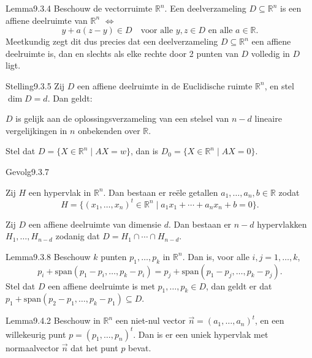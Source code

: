 \begin{res}{Lemma}{9.3.4}
Beschouw de vectorruimte $\mathbb R^n$. Een deelverzameling $D\subseteq\mathbb R^n$ is een affiene deelruimte van $\mathbb R^n$ \(\iff\)
\[
y+a(z-y)\in D \quad\text{voor alle } y,z\in D \text{ en alle } a\in\mathbb R. \tag{9.3}
\]
Meetkundig zegt dit dus precies dat een deelverzameling $D\subseteq\mathbb R^n$ een affiene deelruimte is, dan en slechts als elke rechte door 2 punten van $D$ volledig in $D$ ligt.
\end{res}

\begin{res}{Stelling}{9.3.5}
Zij $D$ een affiene deelruimte in de Euclidische ruimte $\mathbb R^n$, en stel $\dim D=d$. Dan geldt:
\begin{myenum}
\item $D$ is gelijk aan de oplossingsverzameling van een stelsel van $n-d$ lineaire vergelijkingen in $n$ onbekenden over $\mathbb R$.
\item Stel dat $D=\{X\in\mathbb R^n\mid AX=w\}$, dan is $D_0=\{X\in\mathbb R^n\mid AX=0\}$.
\end{myenum}
\end{res}

\begin{res}{Gevolg}{9.3.7}
\begin{myenum}
\item Zij $H$ een hypervlak in $\mathbb R^n$. Dan bestaan er re\"ele getallen $a_1,\dots,a_n,b\in\mathbb R$ zodat
\[
H=\{(x_1,\dots,x_n)^t\in\mathbb R^n \mid a_1x_1+\cdots+a_nx_n+b=0\}.
\]
\item Zij $D$ een affiene deelruimte van dimensie $d$. Dan bestaan er $n-d$ hypervlakken $H_1,\dots,H_{n-d}$ zodanig dat $D=H_1\cap\cdots\cap H_{n-d}$.
\end{myenum}
\end{res}

\begin{res}{Lemma}{9.3.8}
Beschouw $k$ punten $p_1,\dots,p_k$ in $\mathbb R^n$. Dan is, voor alle $i,j=1,\dots,k$,
\[
p_i+\mathrm{span}(p_1-p_i,\dots,p_k-p_i)=p_j+\mathrm{span}(p_1-p_j,\dots,p_k-p_j).
\]
Stel dat $D$ een affiene deelruimte is met $p_1,\dots,p_k\in D$, dan geldt er dat $p_1+\mathrm{span}(p_2-p_1,\dots,p_k-p_1)\subseteq D$.
\end{res}

\begin{res}{Lemma}{9.4.2}
Beschouw in $\mathbb R^n$ een niet-nul vector $\vec n=(a_1,\dots,a_n)^t$, en een willekeurig punt $p=(p_1,\dots,p_n)^t$. Dan is er een uniek hypervlak met normaalvector $\vec n$ dat het punt $p$ bevat.
\end{res}

